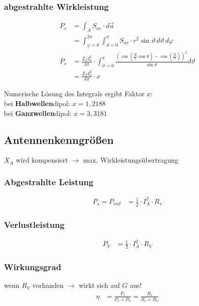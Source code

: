 \subsubsection{abgestrahlte Wirkleistung}
\begin{align*}
	P_{s} & = \int_A S_{av}\cdot d\vec{a}                                                                                                                                                           \\
	      & = \int^{2\pi}_{\varphi = 0}\int^{\pi}_{\vartheta = 0} S_{av}\cdot r^2 \sin\vartheta \, d\vartheta \, d\varphi                                                                           \\
	P_{s} & = \frac{Z_{F}I_0^2}{4\pi}\cdot\int^{\pi}_{\vartheta=0}\frac{\left(\cos\left(\frac{\beta l}{2}\cos\vartheta\right)-\cos\left(\frac{\beta l}{2}\right)\right)^2}{\sin\vartheta}d\vartheta \\
	      & = \frac{Z_{F}I_0^2}{4\pi}\cdot x
\end{align*}

Numerische Lösung des Integrals ergibt Faktor $ x $:\\
bei \textbf{Halbwellen}dipol: $ x=1,2188 $\\
bei \textbf{Ganzwellen}dipol: $ x=3,3181$

\subsection{Antennenkenngrößen}


$ X_A $ wird kompensiert $ \rightarrow $ max. Wirkleistungsübertragung

\subsubsection{Abgestrahlte Leistung}
\begin{align*}
	P_s = P_{rad} & = \frac{1}{2}\cdot I_A^2 \cdot R_s
\end{align*}

\subsubsection{Verlustleistung}
\begin{align*}
	P_V & = \frac{1}{2}\cdot I_A^2\cdot R_V
\end{align*}

\subsubsection{Wirkungsgrad}
wenn $ R_V $ vorhanden $\rightarrow$ wirkt sich auf $ G $ aus!
\begin{align*}
	\eta & = \frac{P_s}{P_s + P_V} = \frac{R_s}{R_s + R_V}
\end{align*}

